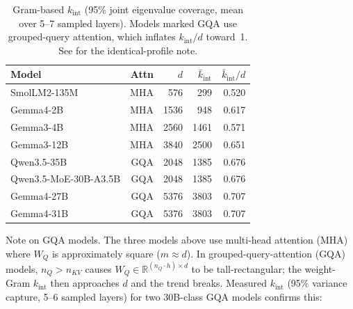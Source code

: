\documentclass[11pt]{article}
\begin{document}
\begin{table}[h]\centering\small
\caption{Gram-based $k_{\mathrm{int}}$ (95\% joint eigenvalue
coverage, mean over 5--7 sampled layers).  Models marked GQA use
grouped-query attention, which inflates $k_{\mathrm{int}}/d$ toward~1.
See  for the identical-profile note.}
\label{tab:kint-generalise}
\begin{tabular}{@{}lrrrr@{}}
\toprule
Model & Attn & $d$ & $\bar k_{\mathrm{int}}$ & $\bar k_{\mathrm{int}}/d$ \\
\midrule
SmolLM2-135M             & MHA & 576  & 299  & 0.520 \\
Gemma4-2B                & MHA & 1536 & 948  & 0.617 \\
Gemma3-4B                & MHA & 2560 & 1461 & 0.571 \\
Gemma3-12B               & MHA & 3840 & 2500 & 0.651 \\
Qwen3.5-35B              & GQA & 2048 & 1385 & 0.676 \\
Qwen3.5-MoE-30B-A3.5B   & GQA & 2048 & 1385 & 0.676 \\
Gemma4-27B               & GQA & 5376 & 3803 & 0.707 \\
Gemma4-31B               & GQA & 5376 & 3803 & 0.707 \\
\bottomrule
\end{tabular}
\end{table}

\smallskip\noindent Note on GQA models.
The three models above use multi-head attention (MHA) where $W_Q$ is
approximately square ($m\approx d$). In grouped-query-attention (GQA)
models, $n_Q>n_{KV}$ causes $W_Q\!\in\!\mathbb{R}^{(n_Q \cdot h)\times d}$
to be tall-rectangular; the weight-Gram $k_{\mathrm{int}}$ then approaches
$d$ and the trend breaks. Measured $k_{\mathrm{int}}$ (95\% variance capture,
5--6 sampled layers) for two 30B-class GQA models confirms this:
\end{document}
